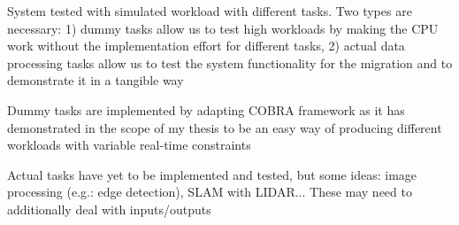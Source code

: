 
	\item System tested with simulated workload with different tasks. Two types are necessary: 1) dummy tasks allow us to test high workloads by making the CPU work without the implementation effort for different tasks, 2) actual data processing tasks allow us to test the system functionality for the migration and to demonstrate it in a tangible way
	\item Dummy tasks are implemented by adapting COBRA framework as it has demonstrated in the scope of my thesis to be an easy way of producing different workloads with variable real-time constraints
	\item Actual tasks have yet to be implemented and tested, but some ideas: image processing (e.g.: edge detection), SLAM with LIDAR... These may need to additionally deal with inputs/outputs


